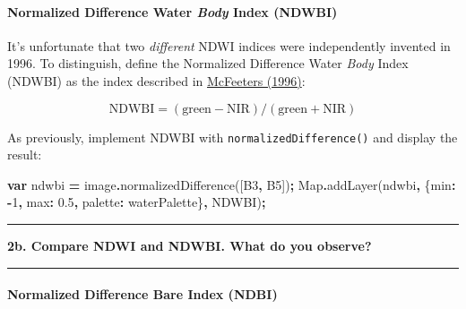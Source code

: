 \documentclass[
]{article}
\newenvironment{Shaded}{\begin{snugshade}}{\end{snugshade}}
\newcommand{\BuiltInTok}[1]{#1}
\newcommand{\DataTypeTok}[1]{\textcolor[rgb]{0.13,0.29,0.53}{#1}}
\newcommand{\DecValTok}[1]{\textcolor[rgb]{0.00,0.00,0.81}{#1}}
\newcommand{\FloatTok}[1]{\textcolor[rgb]{0.00,0.00,0.81}{#1}}
\newcommand{\FunctionTok}[1]{\textcolor[rgb]{0.00,0.00,0.00}{#1}}
\newcommand{\KeywordTok}[1]{\textcolor[rgb]{0.13,0.29,0.53}{\textbf{#1}}}
\newcommand{\NormalTok}[1]{#1}
\newcommand{\OperatorTok}[1]{\textcolor[rgb]{0.81,0.36,0.00}{\textbf{#1}}}
\newcommand{\StringTok}[1]{\textcolor[rgb]{0.31,0.60,0.02}{#1}}
\begin{document}
\hypertarget{normalized-difference-water-body-index-ndwbi}{%
\paragraph{\texorpdfstring{Normalized Difference Water \emph{Body} Index (NDWBI)}{Normalized Difference Water Body Index (NDWBI)}}\label{normalized-difference-water-body-index-ndwbi}}

It's unfortunate that two \emph{different} NDWI indices were independently invented in 1996. To distinguish, define the Normalized Difference Water \emph{Body} Index (NDWBI) as the index described in \href{http://www.tandfonline.com/doi/abs/10.1080/01431169608948714\#.VkThFHyrTlM}{McFeeters (1996)}:

\[\text{NDWBI} = (\text{green} - \text{NIR}) / (\text{green} + \text{NIR})\]

As previously, implement NDWBI with \texttt{normalizedDifference()} and display the result:

\begin{Shaded}
\begin{Highlighting}[]
\KeywordTok{var}\NormalTok{ ndwbi }\OperatorTok{=}\NormalTok{ image}\OperatorTok{.}\FunctionTok{normalizedDifference}\NormalTok{([}\StringTok{\textquotesingle{}B3\textquotesingle{}}\OperatorTok{,} \StringTok{\textquotesingle{}B5\textquotesingle{}}\NormalTok{])}\OperatorTok{;}   
\BuiltInTok{Map}\OperatorTok{.}\FunctionTok{addLayer}\NormalTok{(ndwbi}\OperatorTok{,} 
\NormalTok{             \{}\DataTypeTok{min}\OperatorTok{:} \OperatorTok{{-}}\DecValTok{1}\OperatorTok{,} 
              \DataTypeTok{max}\OperatorTok{:} \FloatTok{0.5}\OperatorTok{,}  
              \DataTypeTok{palette}\OperatorTok{:}\NormalTok{ waterPalette\}}\OperatorTok{,} 
             \StringTok{\textquotesingle{}NDWBI\textquotesingle{}}\NormalTok{)}\OperatorTok{;}   
\end{Highlighting}
\end{Shaded}

\begin{center}\rule{0.5\linewidth}{0.5pt}\end{center}

\textbf{2b. Compare NDWI and NDWBI. What do you observe?}

\begin{center}\rule{0.5\linewidth}{0.5pt}\end{center}

\hypertarget{normalized-difference-bare-index-ndbi}{%
\paragraph{Normalized Difference Bare Index (NDBI)}\label{normalized-difference-bare-index-ndbi}}
\end{document}
